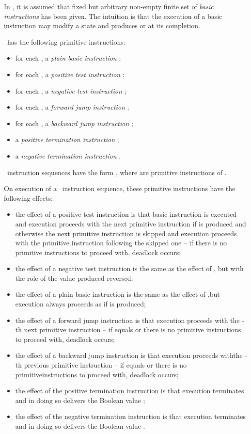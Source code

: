 \documentclass[fleqn]{llncs}
\begin{document}
In \PGLBbt, it is assumed that fixed but arbitrary non-empty finite set
 of \emph{basic instructions} has been given.
The intuition is that the execution of a basic instruction may modify a
state and produces  or  at its completion.

\PGLBbt\ has the following primitive instructions:
\begin{itemize}
\item
for each , a \emph{plain basic instruction} ;
\item
for each , a \emph{positive test instruction} ;
\item
for each , a \emph{negative test instruction} ;
\item
for each , a \emph{forward jump instruction}
;
\item
for each , a \emph{backward jump instruction}
;
\item
a \emph{positive termination instruction} ;
\item
a \emph{negative termination instruction} .
\end{itemize}
\PGLBbt\ instruction sequences have the form , where  are primitive instructions of \PGLBbt.

On execution of a \PGLBbt\ instruction sequence, these primitive
instructions have the following effects:
\begin{itemize}
\item
the effect of a positive test instruction  is that basic
instruction  is executed and execution proceeds with the next
primitive instruction if  is produced and otherwise the next
primitive instruction is skipped and execution proceeds with the
primitive instruction following the skipped one -- if there is no
primitive instructions to proceed with, deadlock occurs;
\item
the effect of a negative test instruction  is the same as the
effect of , but with the role of the value produced reversed;
\item
the effect of a plain basic instruction  is the same as the effect of
,\linebreak[2] but execution always proceeds as if  is
produced;
\item
the effect of a forward jump instruction  is that execution
proceeds with the -th next primitive instruction -- if  equals 
or there is no primitive instructions to proceed with, deadlock occurs;
\item
the effect of a backward jump instruction  is that execution
proceeds with\linebreak[2] the -th previous primitive instruction --
if  equals  or there is no primitive\linebreak[2] instructions to
proceed with, deadlock occurs;
\item
the effect of the positive termination instruction  is that
execution terminates and in doing so delivers the Boolean value ;
\item
the effect of the negative termination instruction  is that
execution terminates and in doing so delivers the Boolean value
.
\end{itemize}
\end{document}
